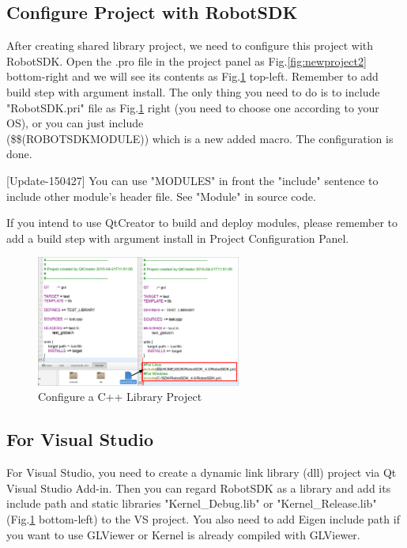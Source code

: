 \documentclass[a4paper,10pt]{book}
\begin{document}
\subsection{Configure Project with RobotSDK}

After creating shared library project, we need to configure this project with RobotSDK. Open the .pro file in the project panel as Fig.\ref{fig:newproject2} bottom-right and we will see its contents as Fig.\ref{fig:configproject1} top-left. Remember to add build step with argument install. The only thing you need to do is to include "RobotSDK.pri" file as Fig.\ref{fig:configproject1} right (you need to choose one according to your OS), or you can just include \\(\$\$(ROBOTSDKMODULE)) which is a new added macro. The configuration is done.

[Update-150427] You can use "MODULES" in front the "include" sentence to include other module's header file. See "Module" in source code. 

If you intend to use QtCreator to build and deploy modules, please remember to add a build step with argument install in Project Configuration Panel. 

\begin{figure}
 \centering
 \includegraphics[width=0.6\textwidth]{img/configproject1.eps}
 \caption{Configure a C++ Library Project}
 \label{fig:configproject1}
\end{figure}

\subsection{For Visual Studio}

For Visual Studio, you need to create a dynamic link library (dll) project via Qt Visual Studio Add-in. Then you can regard RobotSDK as a library and add its include path and static libraries "Kernel\_Debug.lib" or "Kernel\_Release.lib" (Fig.\ref{fig:configproject1} bottom-left) to the VS project. You also need to add Eigen include path if you want to use GLViewer or Kernel is already compiled with GLViewer.
\end{document}
